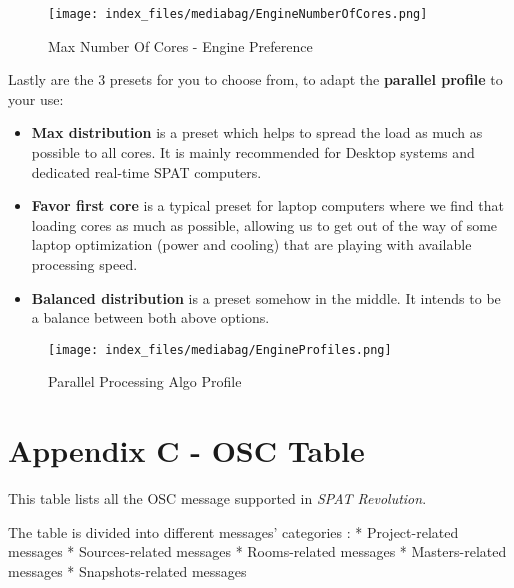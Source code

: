 \documentclass[
  letterpaper,
  DIV=11,
  numbers=noendperiod]{scrreport}
\begin{document}
\begin{figure}

{\centering \texttt{[image: index\_files/mediabag/EngineNumberOfCores.png]}

}

\caption{Max Number Of Cores - Engine Preference}

\end{figure}

Lastly are the 3 presets for you to choose from, to adapt the
\textbf{parallel profile} to your use:

\begin{itemize}
\item
  \textbf{Max distribution} is a preset which helps to spread the load
  as much as possible to all cores. It is mainly recommended for Desktop
  systems and dedicated real-time SPAT computers.
\item
  \textbf{Favor first core} is a typical preset for laptop computers
  where we find that loading cores as much as possible, allowing us to
  get out of the way of some laptop optimization (power and cooling)
  that are playing with available processing speed.
\item
  \textbf{Balanced distribution} is a preset somehow in the middle. It
  intends to be a balance between both above options.
\end{itemize}

\begin{figure}

{\centering \texttt{[image: index\_files/mediabag/EngineProfiles.png]}

}

\caption{Parallel Processing Algo Profile}

\end{figure}


\hypertarget{appendix-c---osc-table}{%
\chapter{Appendix C - OSC Table}\label{appendix-c---osc-table}}

This table lists all the OSC message supported in \emph{SPAT
Revolution}.

The table is divided into different messages' categories : *
Project-related messages * Sources-related messages * Rooms-related
messages * Masters-related messages * Snapshots-related messages
\end{document}
